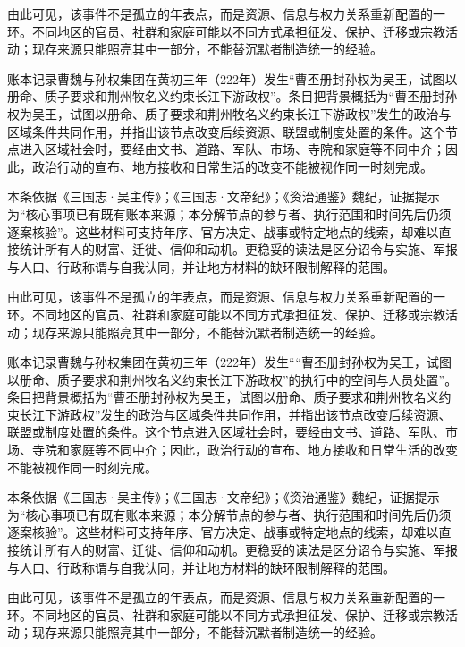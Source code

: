 由此可见，该事件不是孤立的年表点，而是资源、信息与权力关系重新配置的一环。不同地区的官员、社群和家庭可能以不同方式承担征发、保护、迁移或宗教活动；现存来源只能照亮其中一部分，不能替沉默者制造统一的经验。

账本记录曹魏与孙权集团在黄初三年（222年）发生“曹丕册封孙权为吴王，试图以册命、质子要求和荆州牧名义约束长江下游政权”。条目把背景概括为“曹丕册封孙权为吴王，试图以册命、质子要求和荆州牧名义约束长江下游政权”发生的政治与区域条件共同作用，并指出该节点改变后续资源、联盟或制度处置的条件。这个节点进入区域社会时，要经由文书、道路、军队、市场、寺院和家庭等不同中介；因此，政治行动的宣布、地方接收和日常生活的改变不能被视作同一时刻完成。

本条依据《三国志·吴主传》；《三国志·文帝纪》；《资治通鉴》魏纪，证据提示为“核心事项已有既有账本来源；本分解节点的参与者、执行范围和时间先后仍须逐案核验”。这些材料可支持年序、官方决定、战事或特定地点的线索，却难以直接统计所有人的财富、迁徙、信仰和动机。更稳妥的读法是区分诏令与实施、军报与人口、行政称谓与自我认同，并让地方材料的缺环限制解释的范围。

由此可见，该事件不是孤立的年表点，而是资源、信息与权力关系重新配置的一环。不同地区的官员、社群和家庭可能以不同方式承担征发、保护、迁移或宗教活动；现存来源只能照亮其中一部分，不能替沉默者制造统一的经验。

账本记录曹魏与孙权集团在黄初三年（222年）发生““曹丕册封孙权为吴王，试图以册命、质子要求和荆州牧名义约束长江下游政权”的执行中的空间与人员处置”。条目把背景概括为“曹丕册封孙权为吴王，试图以册命、质子要求和荆州牧名义约束长江下游政权”发生的政治与区域条件共同作用，并指出该节点改变后续资源、联盟或制度处置的条件。这个节点进入区域社会时，要经由文书、道路、军队、市场、寺院和家庭等不同中介；因此，政治行动的宣布、地方接收和日常生活的改变不能被视作同一时刻完成。

本条依据《三国志·吴主传》；《三国志·文帝纪》；《资治通鉴》魏纪，证据提示为“核心事项已有既有账本来源；本分解节点的参与者、执行范围和时间先后仍须逐案核验”。这些材料可支持年序、官方决定、战事或特定地点的线索，却难以直接统计所有人的财富、迁徙、信仰和动机。更稳妥的读法是区分诏令与实施、军报与人口、行政称谓与自我认同，并让地方材料的缺环限制解释的范围。

由此可见，该事件不是孤立的年表点，而是资源、信息与权力关系重新配置的一环。不同地区的官员、社群和家庭可能以不同方式承担征发、保护、迁移或宗教活动；现存来源只能照亮其中一部分，不能替沉默者制造统一的经验。

